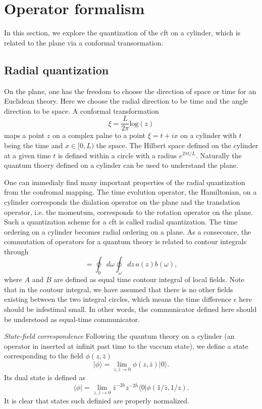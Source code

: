 \documentclass[submission, PhysLectNotes]{SciPost}
\begin{document}
\section{Operator formalism}
In this section, we explore the quantization of the cft on a cylinder, which is related to the plane via a conformal transormation. 

\subsection{Radial quantization}
On the plane, one has the freedom to choose the direction of space or time for an Euclidean theory. Here we choose the radial direction to be time and the angle direction to be space. A conformal transformation
\begin{equation}
	\xi = \frac{L}{2\pi}\mathrm{log}\left(z\right)
\end{equation}
maps a point $z$ on a complex palne to a point $\xi=t+ix$ on a cylinder with $t$ being the time and $x\in[0,L)$ the space. The Hilbert space defined on the cylinder at a given time $t$ is defined within a circle with a radius $e^{2\pi t/L}$. Naturally the quantum thoery defined on a cylinder can be used to understand the plane. 

One can immedialy find many important properties of the radial quantization from the confromal mapping. The time evolution operator, the Hamiltonian, on a cylinder corresponds the dialation operator on the plane and the translation operator, i.e.  the momentum, corresponds to the rotation operator on the plane. Such a quantization scheme for a cft is called radial quantization. The time ordering on a cylinder becomes radial ordering on a plane. As  a conseconce, the commutation of operators for a quantum theory is related to contour integrals through
\begin{equation}
	[A,B] = \oint_0 d\omega \oint_\omega dz \, a(z)b(\omega),
\end{equation}
where $A$ and $B$ are defined as equal time contour integral of local fields. Note that in the coutour integral, we have assumed that there is no other fields existing between the two integral circles, which means the time difference $\epsilon$ here should be infestimal small. In other words, the communicator defined here should be understood as equal-time communicator.

{\it State-field correspondence} Following the quantum theory on a cylinder (an operator in inserted at infinit past time to the vaccum state), we define a state corresponding to the field $\phi(z,\bar{z})$
\begin{equation}
	\vert \phi \rangle = \lim_{z,\bar{z}\to 0}\phi(z,\bar{z})\vert0\rangle.
\end{equation}
Its dual state is defined as 
\begin{equation}
	\langle \phi \vert = \lim_{z,\bar{z}\to 0} \bar{z}^{-2h}z^{-2\bar{h}} \langle 0 \vert \phi(1/\bar{z},1/z).
\end{equation}
It is clear that states such definied are properly normalized. 
\end{document}
